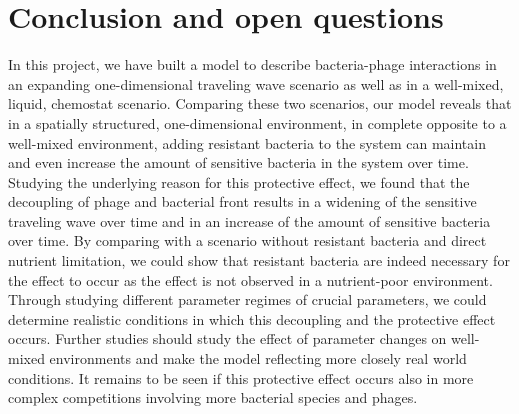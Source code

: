 \chapter{Conclusion and open questions}
\label{chap:conclusion}

In this project, we have built a model to describe bacteria-phage interactions in an expanding one-dimensional traveling wave scenario as well as in a well-mixed, liquid, chemostat scenario. Comparing these two scenarios, our model reveals that in a spatially structured, one-dimensional environment, in complete opposite to a well-mixed environment, adding resistant bacteria to the system can maintain and even increase the amount of sensitive bacteria in the system over time.
Studying the underlying reason for this protective effect, we found that the decoupling of phage and bacterial front results in a widening of the sensitive traveling wave over time and in an increase of the amount of sensitive bacteria over time. By comparing with a scenario without resistant bacteria and direct nutrient limitation, we could show that resistant bacteria are indeed necessary for the effect to occur as the effect is not observed in a nutrient-poor environment. Through studying different parameter regimes of crucial parameters, we could determine realistic conditions in which this decoupling and the protective effect occurs.
Further studies should study the effect of parameter changes on well-mixed environments and make the model reflecting more closely real world conditions. It remains to be seen if this protective effect occurs also in more complex competitions involving more bacterial species and phages.
